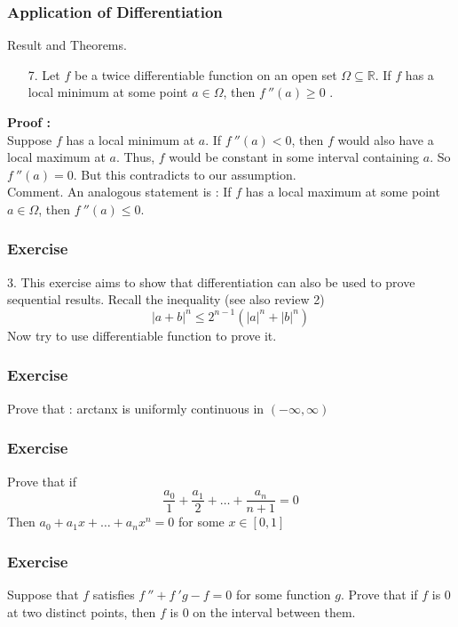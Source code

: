 \documentclass{beamer}
\begin{document}
\begin{frame}
    \frametitle{Application of Differentiation}
    Result and Theorems.\\
    \begin{enumerate}
        \item[7.] Let $f$ be a twice differentiable function on an open set $\Omega\subseteq \mathbb{R}$.
            If $f$ has a local minimum at some point $a\in \Omega$, then $f~''(a)\geq 0$ .
    \end{enumerate}
    \textbf{Proof : }\\
    \hspace{1em} Suppose $f$ has a local minimum at $a$. If $f~''(a)<0$, then $f$ would also have a local maximum at $a$.
    Thus, $f$ would be constant in some interval containing $a$. So $f~''(a)=0$. But this contradicts to our assumption.\\
    \vspace{2em}
    Comment. An analogous statement is : If $f$ has a local maximum at some point $a\in\Omega$, then $f~''(a)\leq 0$.

\end{frame}
\begin{frame}
    \frametitle{Exercise}
    3. This exercise aims to show that differentiation can also be used to prove sequential results. Recall
    the inequality (see also review 2)
    \begin{equation*}
        |a+b|^n\leq 2^{n-1}(|a|^n+|b|^n)
    \end{equation*}
    Now try to use differentiable function to prove it.
\end{frame}
\begin{frame}
    \frametitle{Exercise}
    Prove that : arctanx is uniformly continuous in $(-\infty,\infty)$
\end{frame}

\begin{frame}
    \frametitle{Exercise}
    Prove that if
    \begin{equation*}
        \frac{a_0}{1}+\frac{a_1}{2}+\dots+\frac{a_n}{n+1}=0
    \end{equation*}
    Then $a_0+a_1x+\dots+a_nx^n=0$ for some $x\in[0,1]$
\end{frame}
\begin{frame}
    \frametitle{Exercise}
    Suppose that $f$ satisfies $f~''+f~'g-f=0$ for some function $g$. Prove that if $f$ is 0 at two distinct points,
    then $f$ is 0 on the interval between them.

\end{frame}
\end{document}
